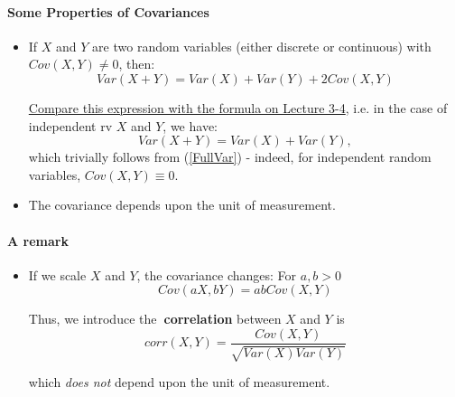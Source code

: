 \documentclass[notes=show,handout]{beamer}\usepackage[]{graphicx}\usepackage[]{color}
\newenvironment{stepitemize}{\begin{itemize}[<+->]}{\end{itemize} }
\begin{document}
\begin{frame}{\secname}

  \framesubtitle{Some Properties of Covariances}
  \begin{itemize}
  \item  If $X$ and $Y$ are two random variables (either discrete or continuous) with $Cov(X,Y) \neq 0$, then:
  \begin{equation}
  Var(X + Y) =  Var(X) + Var(Y) + 2 Cov(X,Y) \label{FullVar}
  \end{equation}

  \underline{Compare this expression with the formula on Lecture 3-4}, i.e. in the case of independent rv $X$ and $Y$, we have:
  $$
  Var(X + Y) =  Var(X) + Var(Y),
  $$
  which trivially follows from (\ref{FullVar}) - indeed, for independent random variables, $Cov(X,Y)\equiv 0$.

  \item The covariance depends upon the unit of measurement.

  \end{itemize}
\end{frame}


\begin{frame}{\secname}
\framesubtitle{A remark}

\begin{stepitemize}
\item If we scale $X$ and $Y$, the covariance changes: For $a,b>0$%
\begin{equation*}
Cov\left( aX,bY\right) =abCov\left( X,Y\right)
\end{equation*}

Thus, we introduce the\textbf{\ correlation} between $X$ and $Y$ is
\begin{equation*}
corr\left( X,Y\right) =\frac{Cov\left( X,Y\right) }{\sqrt{Var\left( X\right)
Var\left( Y\right) }}
\end{equation*}

which \emph{does not }depend upon the unit of measurement.


\end{stepitemize}


\end{frame}
\end{document}
